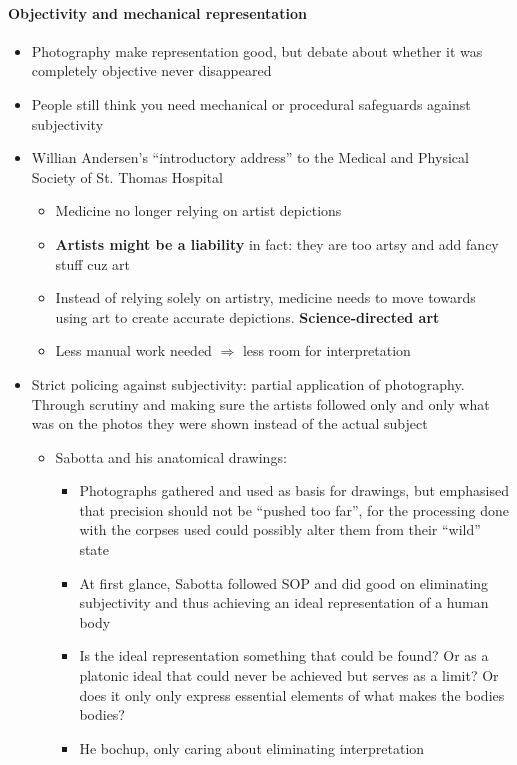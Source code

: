 \documentclass[a4paper]{article}
\begin{document}
\paragraph{Objectivity and mechanical representation}
\begin{itemize}
	\item Photography make representation good, but debate about whether it was completely objective never disappeared
	\item People still think you need mechanical or procedural safeguards against subjectivity
	\item Willian Andersen's ``introductory address'' to the Medical and Physical Society of St. Thomas Hospital
	\begin{itemize}[label=$\circ$]
		\item Medicine no longer relying on artist depictions
		\item \textbf{Artists might be a liability} in fact: they are too artsy and add fancy stuff cuz art
		\item Instead of relying solely on artistry, medicine needs to move towards using art to create accurate depictions. \textbf{Science-directed art}
		\item Less manual work needed $\Rightarrow$ less room for interpretation
	\end{itemize}
	\item Strict policing against subjectivity: partial application of photography. Through scrutiny and making sure the artists followed only and only what was on the photos they were shown instead of the actual subject
	\begin{itemize}[label=$\circ$]
		\item Sabotta and his anatomical drawings:
		\begin{itemize}[label=\tiny$\blacksquare$]
			\item Photographs gathered and used as basis for drawings, but emphasised that precision should not be ``pushed too far'', for the processing done with the corpses used could possibly alter them from their ``wild'' state
			\item At first glance, Sabotta followed SOP and did good on eliminating subjectivity and thus achieving an ideal representation of a human body
			\item Is the ideal representation something that could be found? Or as a platonic ideal that could never be achieved but serves as a limit? Or does it only only express essential elements of what makes the bodies bodies?
			\item He bochup, only caring about eliminating interpretation

\end{itemize}
\end{itemize}
\end{itemize}
\end{document}
